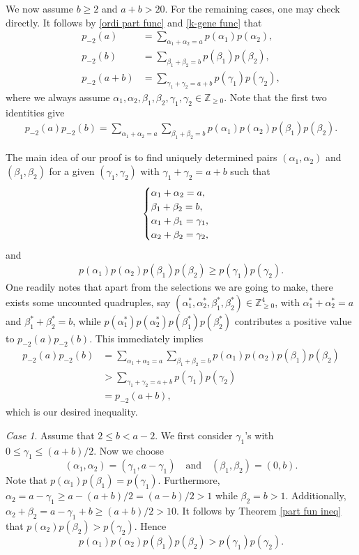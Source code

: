 \documentclass[12pt,reqno]{amsart}
\numberwithin{equation}{section}
\theoremstyle{plain}
\theoremstyle{definition}
\begin{document}
We now assume $b\ge 2$ and $a+b>20$. For the remaining cases, one may check directly. It follows by \eqref{ordi part func} and \eqref{k-gene func} that
\begin{align*}
p_{-2}(a)&=\sum_{\alpha_{1}+\alpha_{2}=a}p(\alpha_{1}) p(\alpha_{2}),\\
p_{-2}(b)&=\sum_{\beta_{1}+\beta_{2}=b}p(\beta_{1})p(\beta_{2}),\\
p_{-2}(a+b) &=\sum_{\gamma_{1}+\gamma_{2}=a+b}p(\gamma_{1})p(\gamma_{2}),
\end{align*}
where we always assume $\alpha_1,\alpha_2,\beta_1,\beta_2,\gamma_1,\gamma_2\in\mathbb{Z}_{\ge 0}$. Note that the first two identities give
\begin{align*}
p_{-2}(a)p_{-2}(b) =\sum_{\alpha_{1}+\alpha_{2}=a}\sum_{\beta_{1}+\beta_{2}=b}p(\alpha_{1})p(\alpha_{2})p(\beta_{1})p(\beta_{2}).
\end{align*}

The main idea of our proof is to find uniquely determined pairs $(\alpha_{1},\alpha_{2})$ and $(\beta_{1},\beta_{2})$ for a given $(\gamma_1,\gamma_2)$ with $\gamma_1+\gamma_2=a+b$ such that
\begin{align*}
\begin{cases}
\alpha_{1}+\alpha_{2}=a, \cr \beta_{1}+\beta_{2}=b, \cr \alpha_{1}+\beta_{1}=\gamma_{1}, \cr \alpha_{2}+\beta_{2}=\gamma_{2},
\end{cases}
\end{align*}
and
\begin{align*}
p(\alpha_{1})p(\alpha_{2})p(\beta_{1})p(\beta_{2})\geq p(\gamma_{1})p(\gamma_{2}).
\end{align*}
One readily notes that apart from the selections we are going to make, there exists some uncounted quadruples, say $(\alpha_1^*,\alpha_2^*,\beta_1^*,\beta_2^*)\in\mathbb{Z}_{\ge 0}^4$, with $\alpha_1^*+\alpha_2^*=a$ and $\beta_1^*+\beta_2^*=b$, while $p(\alpha_{1}^*)p(\alpha_{2}^*)p(\beta_{1}^*)p(\beta_{2}^*)$ contributes a positive value to $p_{-2}(a)p_{-2}(b)$. This immediately implies
\begin{align*}
p_{-2}(a)p_{-2}(b) &=\sum_{\alpha_{1}+\alpha_{2}=a}\sum_{\beta_{1}+\beta_{2}=b}p(\alpha_{1})p(\alpha_{2})p(\beta_{1})p(\beta_{2})\\
&> \sum_{\gamma_{1}+\gamma_{2}=a+b}p(\gamma_{1})p(\gamma_{2})\\
&=p_{-2}(a+b),
\end{align*}
which is our desired inequality.

\textit{Case 1}. Assume that $2\le b<a-2$. We first consider $\gamma_1$'s with $0\le \gamma_1\le (a+b)/2$. Now we choose
$$(\alpha_1,\alpha_2)=(\gamma_1,a-\gamma_1)\quad \text{and} \quad (\beta_1,\beta_2)=(0,b).$$
Note that $p(\alpha_1)p(\beta_1)=p(\gamma_1)$. Furthermore, $\alpha_2=a-\gamma_1\ge a-(a+b)/2=(a-b)/2>1$ while $\beta_2=b> 1$. Additionally, $\alpha_2+\beta_2=a-\gamma_1+b\ge (a+b)/2>10$. It follows by Theorem \ref{part fun ineq} that $p(\alpha_2)p(\beta_2)>p(\gamma_2)$. Hence
$$p(\alpha_{1})p(\alpha_{2})p(\beta_{1})p(\beta_{2})> p(\gamma_{1})p(\gamma_{2}).$$
\end{document}

